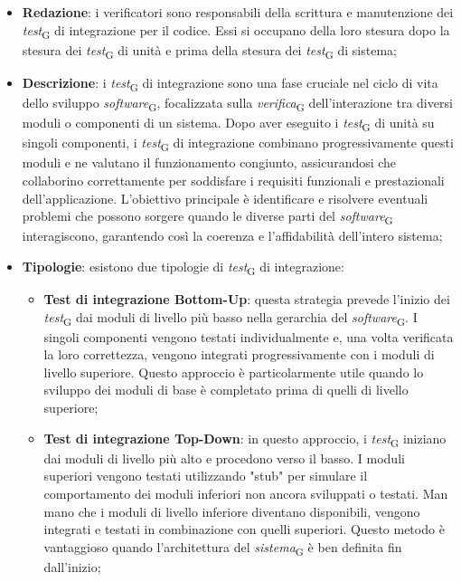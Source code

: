 \begin{itemize}
    \item \textbf{Redazione}: i verificatori sono responsabili della scrittura e manutenzione dei \textit{test}\textsubscript{G} di integrazione per il codice. Essi si occupano della loro stesura dopo la stesura dei \textit{test}\textsubscript{G} di unità e prima della stesura dei \textit{test}\textsubscript{G} di sistema;
    \item \textbf{Descrizione}: i \textit{test}\textsubscript{G} di integrazione sono una fase cruciale nel ciclo di vita dello sviluppo \textit{software}\textsubscript{G}, focalizzata sulla \textit{verifica}\textsubscript{G} dell'interazione tra diversi moduli o componenti di un sistema. Dopo aver eseguito i \textit{test}\textsubscript{G} di unità su singoli componenti, i \textit{test}\textsubscript{G} di integrazione combinano progressivamente questi moduli e ne valutano il funzionamento congiunto, assicurandosi che collaborino correttamente per soddisfare i requisiti funzionali e prestazionali dell'applicazione. L'obiettivo principale è identificare e risolvere eventuali problemi che possono sorgere quando le diverse parti del \textit{software}\textsubscript{G} interagiscono, garantendo così la coerenza e l'affidabilità dell'intero sistema;
    \item \textbf{Tipologie}: esistono due tipologie di \textit{test}\textsubscript{G} di integrazione:
    \begin{itemize}
        \item \textbf{Test di integrazione Bottom-Up}: questa strategia prevede l'inizio dei \textit{test}\textsubscript{G} dai moduli di livello più basso nella gerarchia del \textit{software}\textsubscript{G}. I singoli componenti vengono testati individualmente e, una volta verificata la loro correttezza, vengono integrati progressivamente con i moduli di livello superiore. Questo approccio è particolarmente utile quando lo sviluppo dei moduli di base è completato prima di quelli di livello superiore;
        \item \textbf{Test di integrazione Top-Down}: in questo approccio, i \textit{test}\textsubscript{G} iniziano dai moduli di livello più alto e procedono verso il basso. I moduli superiori vengono testati utilizzando "stub" per simulare il comportamento dei moduli inferiori non ancora sviluppati o testati. Man mano che i moduli di livello inferiore diventano disponibili, vengono integrati e testati in combinazione con quelli superiori. Questo metodo è vantaggioso quando l'architettura del \textit{sistema}\textsubscript{G} è ben definita fin dall'inizio;
    \end{itemize}
\end{itemize}


